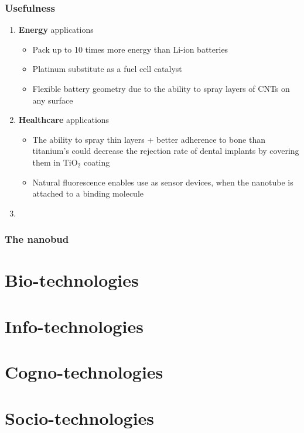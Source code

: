 \documentclass{beamer}
\begin{document}
\begin{frame}
	\frametitle{Usefulness}
	\begin{enumerate}
		\item \textbf{Energy} applications
		\begin{itemize}
			\item Pack up to 10 times more energy than Li-ion batteries
			\item Platinum substitute as a fuel cell catalyst
			\item Flexible battery geometry due to the ability to spray layers of CNTs on any surface
		\end{itemize}
		\item \textbf{Healthcare} applications
			\begin{itemize}
				\item The ability to spray thin layers + better adherence to bone than titanium's could decrease the rejection rate of dental implants by covering them in TiO$_2$ coating
				\item Natural fluorescence enables use as sensor devices, when the nanotube is attached to a binding molecule 
			\end{itemize}
		\item 
	\end{enumerate}
\end{frame}

\begin{frame}
	\frametitle{The nanobud}
\end{frame}

\section{Bio-technologies}

\section{Info-technologies}

\section{Cogno-technologies}

\section{Socio-technologies}
\end{document}
